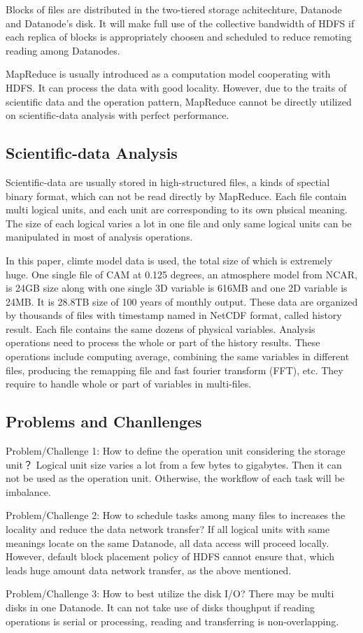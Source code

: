 \documentclass[preprint,12pt]{elsarticle}
\begin{document}
Blocks of files are distributed in the two-tiered storage achitechture, Datanode and Datanode's disk. It will make full use of the
collective bandwidth of HDFS if each replica of blocks is appropriately choosen and scheduled to reduce remoting reading among
Datanodes. \par
MapReduce is usually introduced as a computation model cooperating with HDFS. It can process the data with good locality.
However, due to the traits of scientific data and the operation pattern, MapReduce cannot be directly utilized on scientific-data
analysis with perfect performance.

\subsection{Scientific-data Analysis}
Scientific-data are usually stored in high-structured files, a kinds of spectial binary format, which can not be read directly by
MapReduce. Each file contain multi logical units, and each unit are corresponding to its own phsical meaning. The size of 
each logical varies a lot in one file and only same logical units can be manipulated in most of analysis operations. \par
In this paper, climte model data is used, the total size of which is extremely huge. One single file of CAM at 0.125 degrees,
an atmosphere model from NCAR\cite{neale2010description}, is 24GB size along with one single 3D variable is 616MB and one 2D variable 
is 24MB. It is 28.8TB size of 100 years of monthly output\cite{jacob2012new}. These data are organized by thousands of files with 
timestamp named in NetCDF format, called history result. Each file contains the same dozens of physical variables. Analysis 
operations need to process the whole or part of the history results. These operations include computing average, combining the same 
variables in different files, producing the remapping file and fast fourier transform (FFT), etc. They require to handle whole or
part of variables in multi-files.

\subsection{Problems and Chanllenges} 
Problem/Challenge 1: How to define the operation unit considering the storage unit？ Logical unit size varies a lot from a few bytes to
gigabytes. Then it can not be used as the operation unit. Otherwise, the workflow of each task will be imbalance. \par
Problem/Challenge 2: How to schedule tasks among many files to increases the locality and reduce the data network transfer? If all logical
units with same meanings locate on the same Datanode, all data access will proceed locally. However, default block placement policy of HDFS
cannot ensure that, which leads huge amount data network transfer, as the above mentioned. \par
Problem/Challenge 3: How to best utilize the disk I/O? There may be multi disks in one Datanode. It can not take use of disks thoughput if
reading operations is serial or processing, reading and transferring is non-overlapping.  
\end{document}
